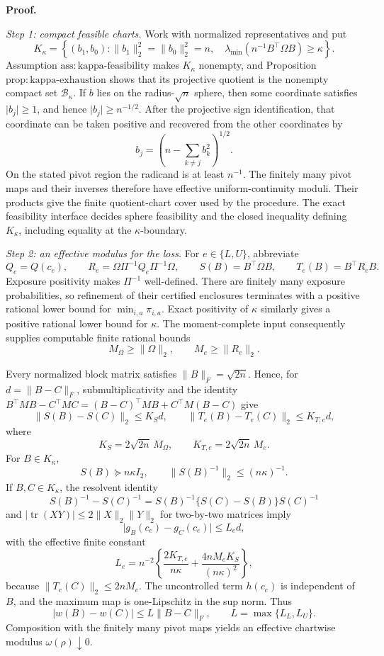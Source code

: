 \textbf{Proof.}

\emph{Step 1: compact feasible charts.}
Work with normalized representatives and put
\[
K_\kappa=
\left\{(b_1,b_0):
\lVert b_1\rVert_2^2=\lVert b_0\rVert_2^2=n,
\quad
\lambda_{\min}\!\left(n^{-1}B^{\top}\Omega B\right)\ge\kappa
\right\}.
\]
Assumption \(\mathrm{ass{:}kappa\mbox{-}feasibility}\) makes \(K_\kappa\) nonempty, and Proposition \(\mathrm{prop{:}kappa\mbox{-}exhaustion}\) shows that its projective quotient is the nonempty compact set \(\mathcal B_\kappa\).  If \(b\) lies on the radius-\(\sqrt n\) sphere, then some coordinate satisfies \(\lvert b_j\rvert\ge1\), and hence \(\lvert b_j\rvert\ge n^{-1/2}\).  After the projective sign identification, that coordinate can be taken positive and recovered from the other coordinates by
\[
b_j=\left(n-\sum_{k\ne j}b_k^2\right)^{1/2}.
\]
On the stated pivot region the radicand is at least \(n^{-1}\).  The finitely many pivot maps and their inverses therefore have effective uniform-continuity moduli.  Their products give the finite quotient-chart cover used by the procedure.  The exact feasibility interface decides sphere feasibility and the closed inequality defining \(K_\kappa\), including equality at the \(\kappa\)-boundary.

\emph{Step 2: an effective modulus for the loss.}
For \(e\in\{L,U\}\), abbreviate
\[
Q_e=Q(c_e),
\qquad
R_e=\Omega\Pi^{-1}Q_e\Pi^{-1}\Omega,
\qquad
S(B)=B^{\top}\Omega B,
\qquad
T_e(B)=B^{\top}R_eB.
\]
Exposure positivity makes \(\Pi^{-1}\) well-defined.  There are finitely many exposure probabilities, so refinement of their certified enclosures terminates with a positive rational lower bound for \(\min_{i,a}\pi_{i,a}\).  Exact positivity of \(\kappa\) similarly gives a positive rational lower bound for \(\kappa\).  The moment-complete input consequently supplies computable finite rational bounds
\[
M_\Omega\ge\lVert\Omega\rVert_2,
\qquad
M_e\ge\lVert R_e\rVert_2.
\]

Every normalized block matrix satisfies \(\lVert B\rVert_F=\sqrt{2n}\).  Hence, for \(d=\lVert B-C\rVert_F\), submultiplicativity and the identity
\(B^{\top}MB-C^{\top}MC=(B-C)^{\top}MB+C^{\top}M(B-C)\) give
\[
\lVert S(B)-S(C)\rVert_2\le K_Sd,
\qquad
\lVert T_e(B)-T_e(C)\rVert_2\le K_{T,e}d,
\]
where
\[
K_S=2\sqrt{2n}\,M_\Omega,
\qquad
K_{T,e}=2\sqrt{2n}\,M_e.
\]
For \(B\in K_\kappa\),
\[
S(B)\succeq n\kappa I_2,
\qquad
\lVert S(B)^{-1}\rVert_2\le(n\kappa)^{-1}.
\]
If \(B,C\in K_\kappa\), the resolvent identity
\[
S(B)^{-1}-S(C)^{-1}
=S(B)^{-1}\{S(C)-S(B)\}S(C)^{-1}
\]
and \(\lvert\operatorname{tr}(XY)\rvert\le2\lVert X\rVert_2\lVert Y\rVert_2\) for two-by-two matrices imply
\[
\lvert g_B(c_e)-g_C(c_e)\rvert\le L_e d,
\]
with the effective finite constant
\[
L_e=n^{-2}\left\{
\frac{2K_{T,e}}{n\kappa}
+\frac{4nM_eK_S}{(n\kappa)^2}
\right\},
\]
because \(\lVert T_e(C)\rVert_2\le2nM_e\).  The uncontrolled term \(h(c_e)\) is independent of \(B\), and the maximum map is one-Lipschitz in the sup norm.  Thus
\[
\lvert w(B)-w(C)\rvert
\le L\lVert B-C\rVert_F,
\qquad
L=\max\{L_L,L_U\}.
\]
Composition with the finitely many pivot maps yields an effective chartwise modulus \(\omega(\rho)\downarrow0\).

